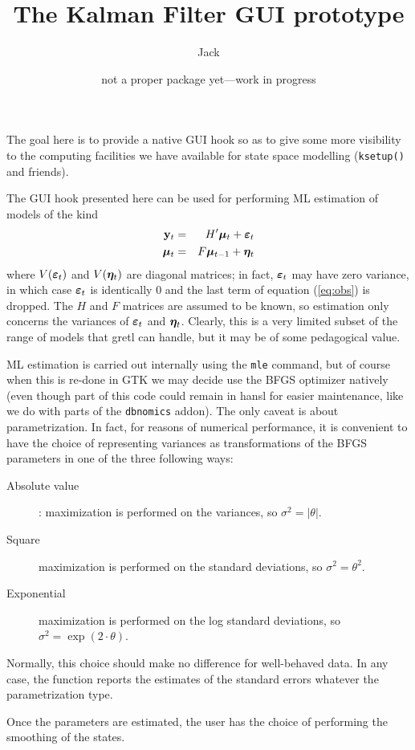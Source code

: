 \documentclass[a4paper]{article}
\title{The Kalman Filter GUI prototype}
\author{Jack}
\date{not a proper package yet---work in progress}
\newcommand{\obs}{\ensuremath\mathbf{y}_t}
\newcommand{\obsdist}{\ensuremath\boldsymbol{\varepsilon}_t}
\newcommand{\state}[1]{\ensuremath\boldsymbol{\mu}_{#1}}
\newcommand{\stdist}{\ensuremath\boldsymbol{\eta}_t}
\begin{document}
\maketitle

The goal here is to provide a native GUI hook so as to give some
more visibility to the computing facilities we have available for
state space modelling (\texttt{ksetup()} and friends).

The GUI hook presented here can be used for performing ML estimation of
models of the kind
\begin{eqnarray}
  \label{eq:obs}
  \obs & = & H' \state{t} + \obsdist \\
  \label{eq:state}
  \state{t} & = & F \state{t-1} + \stdist
\end{eqnarray}
where $V(\obsdist)$ and $V(\stdist)$ are diagonal matrices; in fact,
$\obsdist$ may have zero variance, in which case $\obsdist$ is
identically 0 and the last term of equation (\ref{eq:obs}) is
dropped. The $H$ and $F$ matrices are assumed to be known, so
estimation only concerns the variances of $\obsdist$ and $\stdist$.
Clearly, this is a very limited subset of the range of models that
gretl can handle, but it may be of some pedagogical value.

ML estimation is carried out internally using the \texttt{mle}
command, but of course when this is re-done in GTK we may decide use
the BFGS optimizer natively (even though part of this code could
remain in hansl for easier maintenance, like we do with parts of the
\texttt{dbnomics} addon). The only caveat is about parametrization. In
fact, for reasons of numerical performance, it is convenient to have
the choice of representing variances as transformations of the BFGS
parameters in one of the three following ways:
\begin{description}
\item[Absolute value]: maximization is performed on the variances, so
  $\sigma^2 = |\theta|$.
\item[Square] maximization is performed on the standard deviations, so
  $\sigma^2 = \theta^2$.
\item[Exponential] maximization is performed on the log standard deviations, so
  $\sigma^2 = \exp(2 \cdot \theta)$.
\end{description}
Normally, this choice should make no difference for well-behaved
data. In any case, the function reports the estimates of the standard
errors whatever the parametrization type.

Once the parameters are estimated, the user has the choice of
performing the smoothing of the states.
\end{document}
